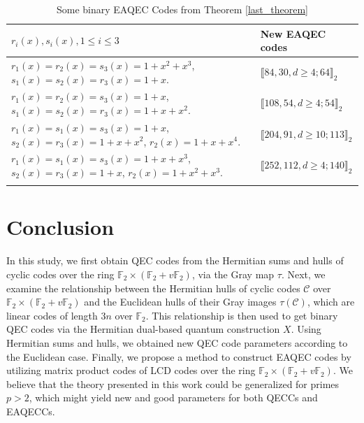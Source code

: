 \documentclass[pdflatex,sn-mathphys-num]{sn-jnl}%
\theoremstyle{thmstyleone}%
\theoremstyle{thmstyletwo}%
\theoremstyle{thmstylethree}%
\begin{document}
\begin{table}[!ht]
\caption{Some binary EAQEC Codes from Theorem \ref{last_theorem}}\label{eaqectable}
 \begin{tabular}{@{}ll@{}}
 \toprule
 $r_i(x),s_i(x),1\leq i\leq 3$ & New EAQEC codes\\
 \midrule
 $r_1(x)=r_2(x)=s_3(x)=1+x^2+x^3$, $s_1(x)=s_2(x)=r_3(x)=1+x$. &  $\llbracket 84,30,d\geq 4;64\rrbracket_2$ \\
 $r_1(x)=r_2(x)=s_3(x)=1+x$, $s_1(x)=s_2(x)=r_3(x)=1+x+x^2$. &  $\llbracket 108,54,d\geq 4;54\rrbracket_2$ \\
 $r_1(x)=s_1(x)=s_3(x)=1+x$, $s_2(x)=r_3(x)=1+x+x^2$, $r_2(x)=1+x+x^4$. &  $\llbracket 204,91,d\geq 10;113\rrbracket_2$ \\
 $r_1(x)=s_1(x)=s_3(x)=1+x+x^3$, $s_2(x)=r_3(x)=1+x$, $r_2(x)=1+x^2+x^3$. &  $\llbracket 252,112,d\geq 4;140\rrbracket_2$ \\

 \botrule
 \end{tabular}
\end{table}

\section{Conclusion} \label{sec6}
In this study, we first obtain QEC codes from the Hermitian sums and hulls of cyclic codes over the ring $\mathbb{F}_2\times(\mathbb{F}_2+v\mathbb{F}_2)$, via the Gray map $\tau$. Next, we examine the relationship between the Hermitian hulls of cyclic codes $\mathcal{C}$ over $\mathbb{F}_2\times(\mathbb{F}_2+v\mathbb{F}_2)$ and the Euclidean hulls of their Gray images
$\tau(\mathcal{C})$, which are linear codes of length $3n$ over $\mathbb{F}_2$. This relationship is then used to get binary QEC codes via the Hermitian dual-based quantum construction $X$. Using Hermitian sums and hulls, we obtained new QEC code parameters according to the Euclidean case. Finally, we propose a method to construct EAQEC codes by utilizing matrix product codes of LCD codes over the ring $\mathbb{F}_2\times(\mathbb{F}_2+v\mathbb{F}_2)$. We believe that the theory presented in this work could be generalized for primes $p>2$, which might yield new and good parameters for both QECCs and EAQECCs.


\end{document}
